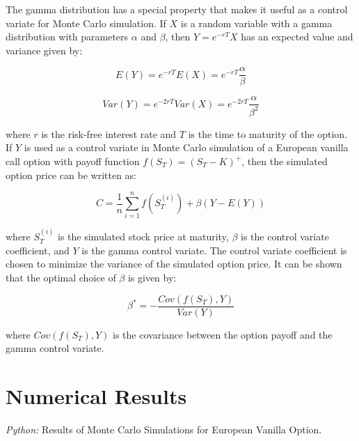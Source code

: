\documentclass[11pt, a4paper, leqno]{article}
\begin{document}
The gamma distribution has a special property that makes it useful as a control variate for Monte Carlo simulation. If $X$ is a random variable with a gamma distribution with parameters $\alpha$ and $\beta$, then $Y = e^{-rT}X$ has an expected value and variance given by:

\begin{equation}
E(Y) = e^{-rT}E(X) = e^{-rT}\frac{\alpha}{\beta}
\end{equation}

\begin{equation}
Var(Y) = e^{-2rT}Var(X) = e^{-2rT}\frac{\alpha}{\beta^2}
\end{equation}

where $r$ is the risk-free interest rate and $T$ is the time to maturity of the option. If $Y$ is used as a control variate in Monte Carlo simulation of a European vanilla call option with payoff function $f(S_T) = (S_T - K)^+$, then the simulated option price can be written as:

\begin{equation}
C = \frac{1}{n} \sum_{i=1}^{n} f(S_T^{(i)}) + \beta(Y - E(Y))
\end{equation}

where $S_T^{(i)}$ is the simulated stock price at maturity, $\beta$ is the control variate coefficient, and $Y$ is the gamma control variate. The control variate coefficient is chosen to minimize the variance of the simulated option price. It can be shown that the optimal choice of $\beta$ is given by:

\begin{equation}
\beta^* = -\frac{Cov(f(S_T), Y)}{Var(Y)}
\end{equation}

where $Cov(f(S_T), Y)$ is the covariance between the option payoff and the gamma control variate.
\section{Numerical Results}\label{sec:results}


\begin{table}[!h]
    
    \caption{\label{tab:results}\emph{Python:} Results of Monte Carlo Simulations for European Vanilla Option.}
\end{table}





\printbibliography
{}



\end{document}
